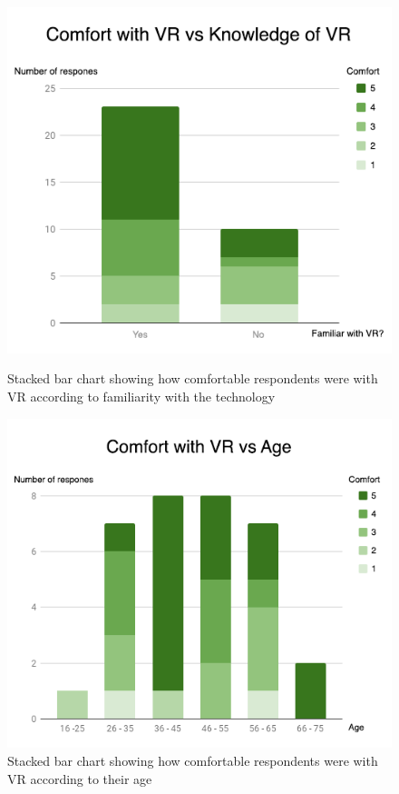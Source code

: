 		
	\begin{figure}[!tbp]
		\centering
		\begin{minipage}[b]{0.49\textwidth}
			\includegraphics[width=1\linewidth]{figure/Analysis/comfort.png}
			\caption{Stacked bar chart showing how comfortable respondents were with VR according to familiarity with the technology}
			\label{fig:comfort}
		\end{minipage}
		\hfill
		\begin{minipage}[b]{0.49\textwidth}
			\includegraphics[width=1\linewidth]{figure/Analysis/vrcomfort.png}
			\caption{Stacked bar chart showing how comfortable respondents were with VR according to their age}
			\label{fig:vrcomfort}
		\end{minipage}
	\end{figure}
	

